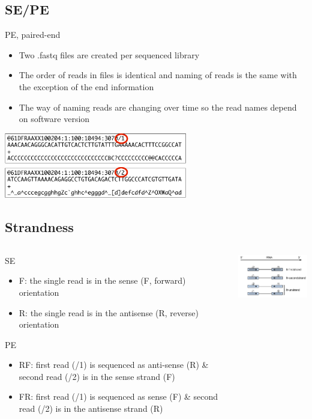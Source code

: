 \documentclass{beamer}\usepackage[]{graphicx}\usepackage[]{color}
\begin{document}
\subsection{SE/PE}
\begin{frame}
\begin{block}{PE, paired-end}
\begin{itemize}
\item Two .fastq files are created per sequenced library
\item The order of reads in files is identical and naming of reads is the same with the exception of the end information
\item The way of naming reads are changing over time so the read names depend on software version
\end{itemize}
\end{block}
\vspace{8mm}
\centering
\includegraphics[width=8cm]{Images/fastqPE.pdf}
\end{frame}

\subsection{Strandness}
\begin{frame}
\footnotesize
\begin{columns}
\begin{column}{0.48\textwidth}
SE
\begin{itemize}
  \item F: the single read is in the sense (F, forward) orientation
  \item R: the single read is in the antisense (R, reverse) orientation
\end{itemize}
PE
\begin{itemize}
\item RF: first read (/1) is sequenced as anti-sense (R) \& second read (/2) is in the sense strand (F)
\item FR: first read (/1) is sequenced as sense (F) \& second read (/2) is in the antisense strand (R)
\end{itemize}
\end{column}
\begin{column}{0.48\textwidth}
\includegraphics[width=5cm]{Images/Stranded.png}
\end{column}
\end{columns}
\end{frame}
\end{document}
